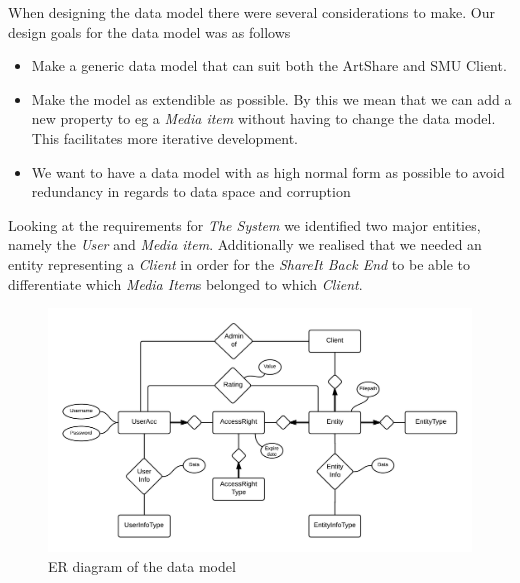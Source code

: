 \documentclass[../report.tex]{subfiles}
\begin{document}
When designing the data model there were several considerations to make. Our design goals for the data model was as follows
\begin{itemize}
\item Make a generic data model that can suit both the ArtShare and SMU Client.
\item Make the model as extendible as possible. By this we mean that we can add a new property to eg a \textit{Media item} without having to change the data model. This facilitates more iterative development.
\item We want to have a data model with as high normal form as possible to avoid redundancy in regards to data space and corruption
\end{itemize} 






Looking at the requirements for \textit{The System} we identified two major entities, namely the \textit{User} and \textit{Media item}. Additionally we realised that we needed an entity representing a \textit{Client} in order for the \textit{ShareIt Back End} to be able to differentiate which \textit{Media Item}s belonged to which \textit{Client}. \\

\begin{figure}[H]
\includegraphics[width=\linewidth]{img/ER.png}
\caption{ER diagram of the data model}
\label{fig:use case diagram}
\end{figure}
\end{document}

